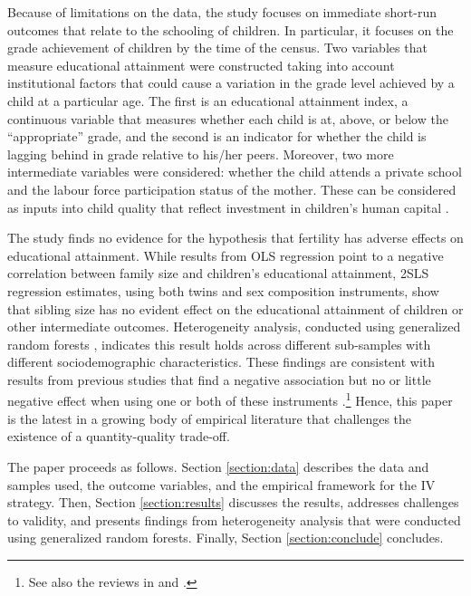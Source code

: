 Because of limitations on the data, the study focuses on immediate short-run outcomes that relate to the schooling of children. In particular, it focuses on the grade achievement of children by the time of the census. Two variables that measure educational attainment were constructed taking into account institutional factors that could cause a variation in the grade level achieved by a child at a particular age. The first is an educational attainment index, a continuous variable that measures whether each child is at, above, or below the “appropriate” grade, and the second is an indicator for whether the child is lagging behind in grade relative to his/her peers. Moreover, two more intermediate variables were considered: whether the child attends a private school and the labour force participation status of the mother. These can be considered as inputs into child quality that reflect investment in children’s human capital \parencite{caceres-delpiano_impacts_2006}.

The study finds no evidence for the hypothesis that fertility has adverse effects on educational attainment. While results from OLS regression point to a negative correlation between family size and children's educational attainment, 2SLS regression estimates, using both twins and sex composition instruments, show that sibling size has no evident effect on the educational attainment of children or other intermediate outcomes. Heterogeneity analysis, conducted using generalized random forests \parencite{Athey2019}, indicates this result holds across different sub-samples with different sociodemographic characteristics. These findings are consistent with results from previous studies that find a negative association but no or little negative effect when using one or both of these instruments \parencite[see, for example,][]{Black2005,Black2010,caceres-delpiano_impacts_2006,angrist_multiple_2010,Ponczek2012,bhalotra_twin_2020}.\footnote{See also the reviews in \textcite{clarke_children_2018} and \textcite{oberg_casual_2021}.} Hence, this paper is the latest in a growing body of empirical literature that challenges the existence of a quantity-quality trade-off.

The paper proceeds as follows. Section \ref{section:data} describes the data and samples used, the outcome variables, and the empirical framework for the IV strategy. Then, Section \ref{section:results} discusses the results, addresses challenges to validity, and presents findings from heterogeneity analysis that were conducted using generalized random forests. Finally, Section \ref{section:conclude} concludes.
